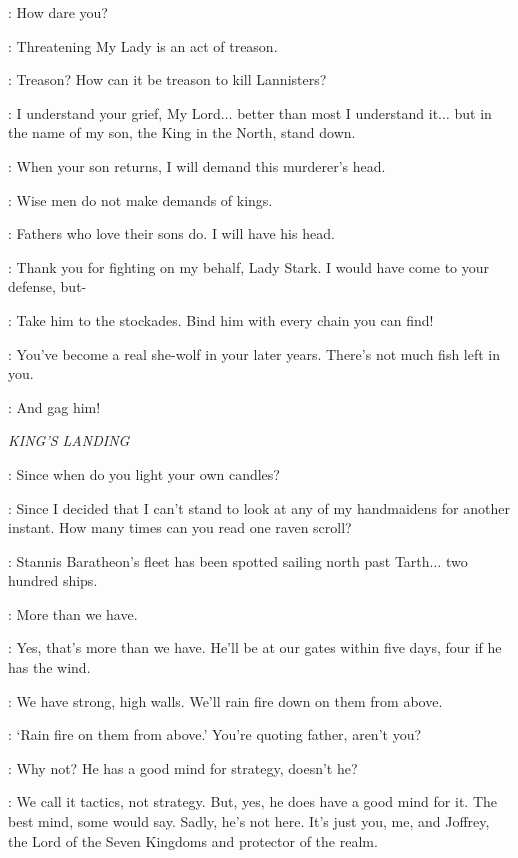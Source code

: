 \CATELYN: How dare you?

\BRIENNE: Threatening My Lady is an act of treason.

\KARSTARK: Treason? How can it be treason to kill Lannisters?

\CATELYN: I understand your grief, My Lord$\ldots$ better than most I understand it$\ldots$ but in the name of my son, the King in the North, stand down.

\KARSTARK: When your son returns, I will demand this murderer's head.

\CATELYN: Wise men do not make demands of kings.

\KARSTARK: Fathers who love their sons do. I will have his head.

\JAIME: Thank you for fighting on my behalf, Lady Stark. I would have come to your defense, but-


\CATELYN: Take him to the stockades. Bind him with every chain you can find!

\JAIME: You've become a real she-wolf in your later years. There's not much fish left in you.

\CATELYN: And gag him!


\scene

\textit{KING'S LANDING}


\TYRION: Since when do you light your own candles?

\CERSEI: Since I decided that I can't stand to look at any of my handmaidens for another instant. How many times can you read one raven scroll?

\TYRION: Stannis Baratheon's fleet has been spotted sailing north past Tarth$\ldots$ two hundred ships.

\CERSEI: More than we have.

\TYRION: Yes, that's more than we have. He'll be at our gates within five days, four if he has the wind.

\CERSEI: We have strong, high walls. We'll rain fire down on them from above.

\TYRION: `Rain fire on them from above.' You're quoting father, aren't you?

\CERSEI: Why not? He has a good mind for strategy, doesn't he?

\TYRION: We call it tactics, not strategy. But, yes, he does have a good mind for it. The best mind, some would say. Sadly, he's not here. It's just you, me, and Joffrey, the Lord of the Seven Kingdoms and protector of the realm.

